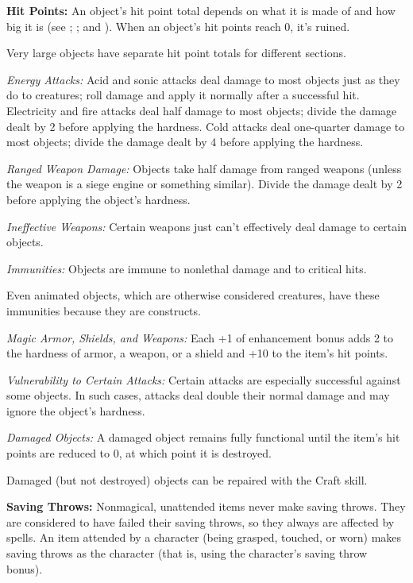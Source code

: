 \textbf{Hit Points:} An object's hit point total depends on what it is made of and how big it is (see ; ; and ). When an object's hit points reach 0, it's ruined.

Very large objects have separate hit point totals for different sections.

\textit{Energy Attacks:} Acid and sonic attacks deal damage to most objects just as they do to creatures; roll damage and apply it normally after a successful hit. Electricity and fire attacks deal half damage to most objects; divide the damage dealt by 2 before applying the hardness. Cold attacks deal one-quarter damage to most objects; divide the damage dealt by 4 before applying the hardness.

\textit{Ranged Weapon Damage:} Objects take half damage from ranged weapons (unless the weapon is a siege engine or something similar). Divide the damage dealt by 2 before applying the object's hardness.

\textit{Ineffective Weapons:} Certain weapons just can't effectively deal damage to certain objects.

\textit{Immunities:} Objects are immune to nonlethal damage and to critical hits.

Even animated objects, which are otherwise considered creatures, have these immunities because they are constructs.

\textit{Magic Armor, Shields, and Weapons:} Each +1 of enhancement bonus adds 2 to the hardness of armor, a weapon, or a shield and +10 to the item's hit points.

\textit{Vulnerability to Certain Attacks:} Certain attacks are especially successful against some objects. In such cases, attacks deal double their normal damage and may ignore the object's hardness.

\textit{Damaged Objects:} A damaged object remains fully functional until the item's hit points are reduced to 0, at which point it is destroyed.

Damaged (but not destroyed) objects can be repaired with the Craft skill.

\textbf{Saving Throws:} Nonmagical, unattended items never make saving throws. They are considered to have failed their saving throws, so they always are affected by spells. An item attended by a character (being grasped, touched, or worn) makes saving throws as the character (that is, using the character's saving throw bonus).


